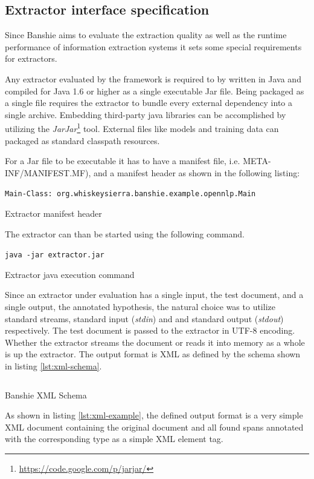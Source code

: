 \subsection{Extractor interface specification}
Since Banshie aims to evaluate the extraction quality as well as the runtime performance of information extraction systems it sets some special requirements for extractors.

Any extractor evaluated by the framework is required to by written in Java and compiled for Java 1.6 or higher as a single executable Jar file. Being packaged as a single file requires the extractor to bundle every external dependency into a single archive. Embedding third-party java libraries can be accomplished by utilizing the \textit{JarJar}\footnote{\url{https://code.google.com/p/jarjar/}} tool. External files like models and training data can packaged as standard classpath resources.

For a Jar file to be executable it has to have a manifest file, i.e. META-INF/MANIFEST.MF), and a manifest header as shown in the following listing:

\begin{listing}[H]
\texttt{Main-Class: org.whiskeysierra.banshie.example.opennlp.Main}
\caption{Extractor manifest header}
\end{listing}

The extractor can than be started using the following command.

\begin{listing}[H]
\texttt{java -jar extractor.jar}
\caption{Extractor java execution command}
\end{listing}

Since an extractor under evaluation has a single input, the test document, and a single output, the annotated hypothesis, the natural choice was to utilize standard streams, standard input (\textit{stdin}) and and standard output (\textit{stdout}) respectively. The test document is passed to the extractor in UTF-8 encoding. Whether the extractor streams the document or reads it into memory as a whole is up the extractor. The output format is \gls{XML} as defined by the schema shown in listing \ref{lst:xml-schema}.

\begin{listing}[H]
\inputminted{xml}{../../../../../banshie-api/src/main/resources/schema.xsd}
\caption{Banshie XML Schema}
\label{lst:xml-schema}
\end{listing}

As shown in listing \ref{lst:xml-example}, the defined output format is a very simple XML document containing the original document and all found spans annotated with the corresponding type as a simple XML element tag.

